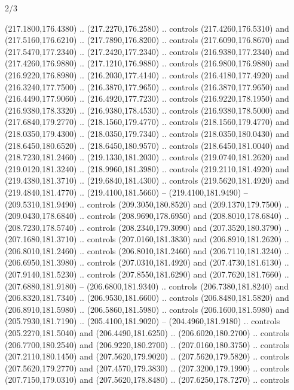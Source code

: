 \begin{flagdescription}{2/3}
\begin{scope}[xshift=0.5\flaglength,yshift=0.5\flagwidth,scale=\flagwidth/259.2]
\begin{scope}[y=0.8pt, x=0.8pt, yscale=-1,shift={(-243,-162)}]
      (217.1800,176.4380) .. (217.2270,176.2580) .. controls (217.4260,176.5310) and
      (217.5160,176.6210) .. (217.7890,176.8200) .. controls (217.6090,176.8670) and
      (217.5470,177.2340) .. (217.2420,177.2340) .. controls (216.9380,177.2340) and
      (217.4260,176.9880) .. (217.1210,176.9880) .. controls (216.9800,176.9880) and
      (216.9220,176.8980) .. (216.2030,177.4140) .. controls (216.4180,177.4920) and
      (216.3240,177.7500) .. (216.3870,177.9650) .. controls (216.3870,177.9650) and
      (216.4490,177.9060) .. (216.4920,177.7230) .. controls (216.9220,178.1950) and
      (216.9380,178.3320) .. (216.9380,178.4530) .. controls (216.9380,178.5000) and
      (217.6840,179.2770) .. (218.1560,179.4770) .. controls (218.1560,179.4770) and
      (218.0350,179.4300) .. (218.0350,179.7340) .. controls (218.0350,180.0430) and
      (218.6450,180.6520) .. (218.6450,180.9570) .. controls (218.6450,181.0040) and
      (218.7230,181.2460) .. (219.1330,181.2030) .. controls (219.0740,181.2620) and
      (219.0120,181.3240) .. (218.9960,181.3980) .. controls (219.2110,181.4920) and
      (219.4380,181.3710) .. (219.6840,181.4300) .. controls (219.5620,181.4920) and
      (219.4840,181.4770) .. (219.4100,181.5660) -- (219.4100,181.9490) --
      (209.5310,181.9490) .. controls (209.3050,180.8520) and (209.1370,179.7500) ..
      (209.0430,178.6840) .. controls (208.9690,178.6950) and (208.8010,178.6840) ..
      (208.7230,178.5740) .. controls (208.2340,179.3090) and (207.3520,180.3790) ..
      (207.1680,181.3710) .. controls (207.0160,181.3830) and (206.8910,181.2620) ..
      (206.8010,181.2460) .. controls (206.8010,181.2460) and (206.7110,181.3240) ..
      (206.6950,181.3980) .. controls (207.0310,181.4920) and (207.4730,181.6130) ..
      (207.9140,181.5230) .. controls (207.8550,181.6290) and (207.7620,181.7660) ..
      (207.6880,181.9180) -- (206.6800,181.9340) .. controls (206.7380,181.8240) and
      (206.8320,181.7340) .. (206.9530,181.6600) .. controls (206.8480,181.5820) and
      (206.8910,181.5980) .. (206.5860,181.5980) .. controls (206.1600,181.5980) and
      (205.7930,181.7190) .. (205.4100,181.9020) -- (204.4960,181.9180) .. controls
      (205.2270,181.5040) and (206.4490,181.6250) .. (206.6020,180.2700) .. controls
      (206.7700,180.2540) and (206.9220,180.2700) .. (207.0160,180.3750) .. controls
      (207.2110,180.1450) and (207.5620,179.9020) .. (207.5620,179.5820) .. controls
      (207.5620,179.2770) and (207.4570,179.3830) .. (207.3200,179.1990) .. controls
      (207.7150,179.0310) and (207.5620,178.8480) .. (207.6250,178.7270) .. controls

\end{scope}
\end{scope}
\end{flagdescription}

